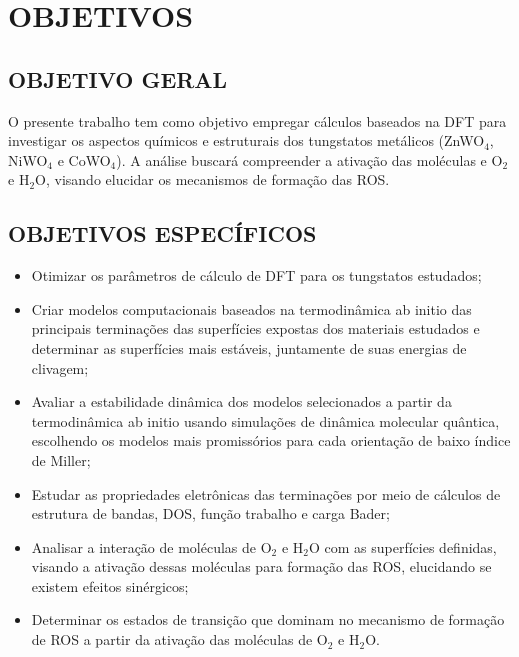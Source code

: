 \chapter{OBJETIVOS}

\section{OBJETIVO GERAL}
O presente trabalho tem como objetivo empregar cálculos baseados na DFT para investigar os aspectos químicos e estruturais dos tungstatos metálicos (ZnWO$_4$, NiWO$_4$ e CoWO$_4$). A análise buscará compreender a ativação das moléculas e O$_2$ e H$_2$O, visando elucidar os mecanismos de formação das ROS.
  
\section{OBJETIVOS ESPECÍFICOS}
\begin{itemize}
  \item Otimizar os parâmetros de cálculo de DFT para os tungstatos estudados;
  \item Criar modelos computacionais baseados na termodinâmica ab initio das principais terminações das superfícies expostas dos materiais estudados e determinar as superfícies mais estáveis, juntamente de suas energias de clivagem;
  \item Avaliar a estabilidade dinâmica dos modelos selecionados a partir da termodinâmica ab initio usando simulações de dinâmica molecular quântica, escolhendo os modelos mais promissórios para cada orientação de baixo índice de Miller;
  \item Estudar as propriedades eletrônicas das terminações por meio de cálculos de estrutura de bandas, DOS, função trabalho e carga Bader;
  \item Analisar a interação de moléculas de O$_2$ e H$_2$O com as superfícies definidas, visando a ativação dessas moléculas para formação das ROS, elucidando se existem efeitos sinérgicos;
  \item Determinar os estados de transição que dominam no mecanismo de formação de ROS a partir da ativação das moléculas de O$_2$ e H$_2$O.
\end{itemize}



